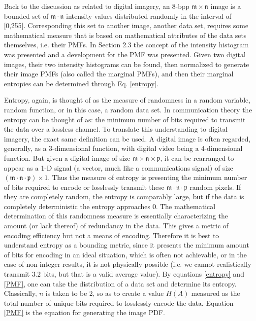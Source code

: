 Back to the discussion as related to digital imagery, an 8-bpp $\mathfrak{m} \times \mathfrak{n}$ image is a bounded  set of $\mathfrak{m} \cdot \mathfrak{n}$ intensity values distributed randomly in the interval of [0,255]. Corresponding this set to another image, \ie{ }another data set, requires some mathematical measure that is based on mathematical attributes of the data sets themselves, i.e. their PMFs. In Section 2.3 the concept of the intensity histogram was presented and a development for the PMF was presented. Given two digital images, their two intensity histograms can be found, then normalized to generate their image PMFs (also called the marginal PMFs), and then their marginal entropies can be determined through Eq. \ref{entropy}.

Entropy, again, is thought of as the measure of randomness in a random variable, random function, or in this case, a random data set. In communication theory the entropy can be thought of as: the minimum number of bits required to transmit the data over a lossless channel. To translate this understanding to digital imagery, the exact same definition can be used. A digital image is often regarded, generally, as a 3-dimensional function, with digital video being a 4-dimensional function. But given a digital image of size $\mathfrak{m} \times \mathfrak{n} \times \mathfrak{p}$, it can be rearranged to appear as a 1-D signal (a vector, much like a communications signal) of size $(\mathfrak{m} \cdot \mathfrak{n} \cdot \mathfrak{p}) \times 1$. Thus the measure of entropy is presenting the minimum number of bits required to encode or losslessly transmit these $\mathfrak{m} \cdot \mathfrak{n} \cdot \mathfrak{p}$ random pixels. If they are completely random, the entropy is comparably large, but if the data is completely deterministic the entropy approaches 0. The mathematical determination of this randomness measure is essentially characterizing the amount (or lack thereof) of redundancy in the data. This gives a metric of encoding efficiency but not a means of encoding. Therefore it is best to understand entropy as a bounding metric, since it presents the minimum amount of bits for encoding in an ideal situation, which is often not achievable, or in the case of non-integer results, it is not physically possible (i.e. we cannot realistically transmit 3.2 bits, but that is a valid average value). By equations \ref{entropy} and \ref{PMF}, one can take the distribution of a data set and determine its entropy. Classically, $n$ is taken to be 2, so as to create a value $H(A)$ measured as the total number of unique bits required to losslessly encode the data. Equation \ref{PMF} is the equation for generating the image PDF.

